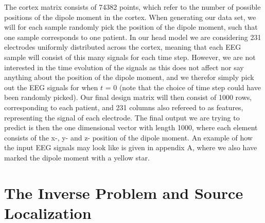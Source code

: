 \documentclass[a4paper, UKenglish, 11pt]{uiomaster}
\begin{document}
The cortex matrix consists of 74382 points, which refer to the number of possible positions of the dipole moment in the cortex. When generating our data set, we will for each sample randomly pick the position of the dipole moment, such that one sample corresponds to one patient. In our head model we are considering 231 electrodes uniformly distributed across the cortex, meaning that each EEG sample will consist of this many signals for each time step. However, we are not interested in the time evolution of the signals as this does not affect nor say anything about the position of the dipole moment, and we therefor simply pick out the EEG signals for when $t$ = 0 (note that the choice of time step could have been randomly picked). Our final design matrix will then consist of 1000 rows, corresponding to each patient, and 231 columns also refereed to as features, representing the signal of each electrode. The final output we are trying to predict is then the one dimensional vector with length 1000, where each element consists of the x-, y- and z- position of the dipole moment. An example of how the input EEG signals may look like is given in appendix A, where we also have marked the dipole moment with a yellow star.

\section{The Inverse Problem and Source Localization}





\end{document}
